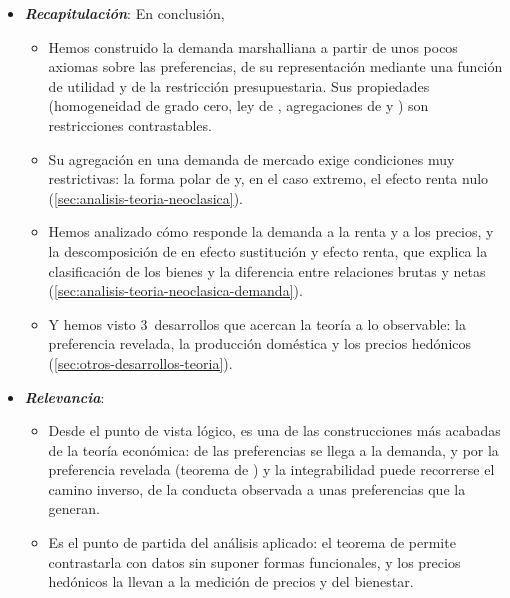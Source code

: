 \documentclass[11pt]{article}
\begin{document}
\begin{itemize}
\item \textbf{\emph{Recapitulación}}: En conclusión,
  \begin{itemize}
  \item Hemos construido la demanda marshalliana a partir de unos pocos axiomas sobre las preferencias, de su representación mediante una función de utilidad y de la restricción presupuestaria. Sus propiedades (homogeneidad de grado cero, ley de , agregaciones de  y ) son restricciones contrastables.
  \item Su agregación en una demanda de mercado exige condiciones muy restrictivas: la forma polar de  y, en el caso extremo, el efecto renta nulo (\ref{sec:analisis-teoria-neoclasica}).
  \item Hemos analizado cómo responde la demanda a la renta y a los precios, y la descomposición de  en efecto sustitución y efecto renta, que explica la clasificación de los bienes y la diferencia entre relaciones brutas y netas (\ref{sec:analisis-teoria-neoclasica-demanda}).
  \item Y hemos visto 3~desarrollos que acercan la teoría a lo observable: la preferencia revelada, la producción doméstica y los precios hedónicos (\ref{sec:otros-desarrollos-teoria}).
  \end{itemize}

\item \textbf{\emph{Relevancia}}:
  \begin{itemize}
  \item Desde el punto de vista lógico, es una de las construcciones más acabadas de la teoría económica: de las preferencias se llega a la demanda, y por la preferencia revelada (teorema de ) y la integrabilidad  puede recorrerse el camino inverso, de la conducta observada a unas preferencias que la generan.
  \item Es el punto de partida del análisis aplicado: el teorema de  permite contrastarla con datos sin suponer formas funcionales, y los precios hedónicos la llevan a la medición de precios y del bienestar.
  \end{itemize}


\end{itemize}
\end{document}
